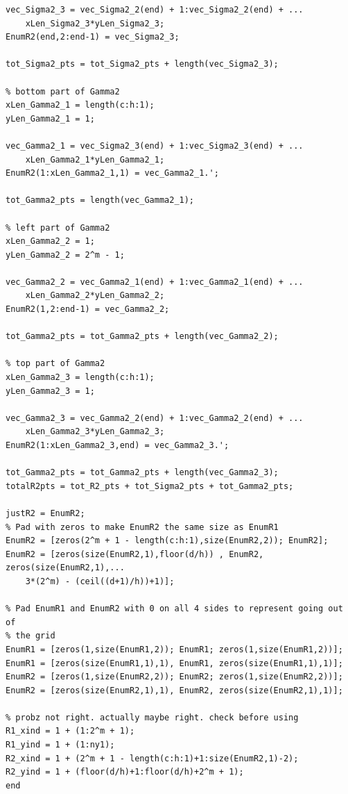 \documentclass[12pt]{article}
\begin{document}
\begin{lstlisting}[caption=Enumeration for all a and b values]
vec_Sigma2_3 = vec_Sigma2_2(end) + 1:vec_Sigma2_2(end) + ...
    xLen_Sigma2_3*yLen_Sigma2_3;
EnumR2(end,2:end-1) = vec_Sigma2_3;

tot_Sigma2_pts = tot_Sigma2_pts + length(vec_Sigma2_3);

% bottom part of Gamma2
xLen_Gamma2_1 = length(c:h:1);
yLen_Gamma2_1 = 1;

vec_Gamma2_1 = vec_Sigma2_3(end) + 1:vec_Sigma2_3(end) + ...
    xLen_Gamma2_1*yLen_Gamma2_1;
EnumR2(1:xLen_Gamma2_1,1) = vec_Gamma2_1.';

tot_Gamma2_pts = length(vec_Gamma2_1);

% left part of Gamma2
xLen_Gamma2_2 = 1;
yLen_Gamma2_2 = 2^m - 1;

vec_Gamma2_2 = vec_Gamma2_1(end) + 1:vec_Gamma2_1(end) + ...
    xLen_Gamma2_2*yLen_Gamma2_2;
EnumR2(1,2:end-1) = vec_Gamma2_2;

tot_Gamma2_pts = tot_Gamma2_pts + length(vec_Gamma2_2);

% top part of Gamma2
xLen_Gamma2_3 = length(c:h:1);
yLen_Gamma2_3 = 1;

vec_Gamma2_3 = vec_Gamma2_2(end) + 1:vec_Gamma2_2(end) + ...
    xLen_Gamma2_3*yLen_Gamma2_3;
EnumR2(1:xLen_Gamma2_3,end) = vec_Gamma2_3.';

tot_Gamma2_pts = tot_Gamma2_pts + length(vec_Gamma2_3);
totalR2pts = tot_R2_pts + tot_Sigma2_pts + tot_Gamma2_pts;

justR2 = EnumR2;
% Pad with zeros to make EnumR2 the same size as EnumR1
EnumR2 = [zeros(2^m + 1 - length(c:h:1),size(EnumR2,2)); EnumR2];
EnumR2 = [zeros(size(EnumR2,1),floor(d/h)) , EnumR2, zeros(size(EnumR2,1),...
    3*(2^m) - (ceil((d+1)/h))+1)];

% Pad EnumR1 and EnumR2 with 0 on all 4 sides to represent going out of
% the grid
EnumR1 = [zeros(1,size(EnumR1,2)); EnumR1; zeros(1,size(EnumR1,2))];
EnumR1 = [zeros(size(EnumR1,1),1), EnumR1, zeros(size(EnumR1,1),1)];
EnumR2 = [zeros(1,size(EnumR2,2)); EnumR2; zeros(1,size(EnumR2,2))];
EnumR2 = [zeros(size(EnumR2,1),1), EnumR2, zeros(size(EnumR2,1),1)];

% probz not right. actually maybe right. check before using
R1_xind = 1 + (1:2^m + 1);
R1_yind = 1 + (1:ny1);
R2_xind = 1 + (2^m + 1 - length(c:h:1)+1:size(EnumR2,1)-2);
R2_yind = 1 + (floor(d/h)+1:floor(d/h)+2^m + 1);
end
\end{lstlisting}
\end{document}
